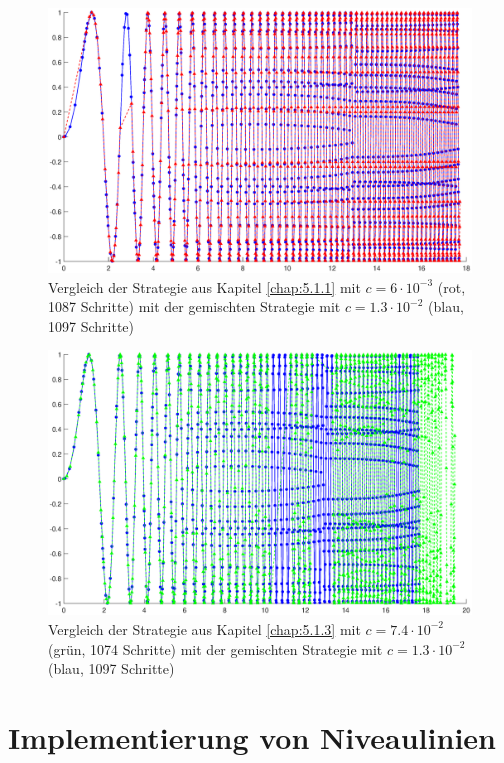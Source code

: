 \documentclass[a4paper,11pt,bibliography=totoc,listof=totoc,headinclude=true,cleardoublepage=empty,oneside]{scrartcl}
\begin{document}
\begin{figure}[H]
	\centering
	\includegraphics[trim = 41mm 0mm 30mm 0mm, clip, width=\linewidth]{plots/adapt/br}
	\caption{Vergleich der Strategie aus Kapitel \ref{chap:5.1.1} mit $c=6 \cdot10^{-3}$ (rot, 1087 Schritte) mit der gemischten Strategie mit $c=1.3 \cdot10^{-2}$ (blau, 1097 Schritte) }
	\label{fig:br}
	
\end{figure}

\begin{figure}[H]
	\centering
	\includegraphics[trim = 41mm 0mm 30mm 0mm, clip, width=\linewidth]{plots/adapt/bg}
	\caption{Vergleich der Strategie aus Kapitel \ref{chap:5.1.3} mit $c=7.4\cdot10^{-2}$ (grün, 1074 Schritte) mit der gemischten Strategie mit $c=1.3 \cdot10^{-2}$ (blau, 1097 Schritte) }
	\label{fig:bg}
\end{figure}

\section{Implementierung von Niveaulinien}
\end{document}
